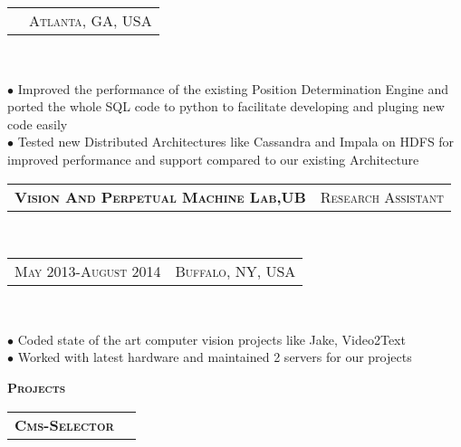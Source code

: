 \documentclass[10pt,a4paper,oneside]{article}
\begin{document}
\begin{minipage}[t]{0.63\textwidth}
{\begin{tabular}{c|c}
               &{\small A\textsc{tlanta}, GA, USA}
            \end{tabular}
        }\\ 
        \vspace{-4mm}
        \begin{adjustwidth}{7pt}{0pt}
            {\footnotesize $\bullet$ Improved the performance of the existing Position Determination Engine and ported the whole SQL code to python to facilitate developing and pluging new code easily\\
            $\bullet$ Tested new Distributed Architectures like Cassandra and Impala on HDFS for improved performance and support compared to our existing Architecture}\\
        \end{adjustwidth}
        \begin{tabular}{c|c}
            \textbf{\normalsize V\textsc{ision} A\textsc{nd} P\textsc{erpetual} M\textsc{achine} L\textsc{ab},UB}
            &\textmd{\normalsize R\textsc{esearch} A\textsc{ssistant}}
        \end{tabular}\\
        \textcolor{light-gray}{
            \begin{tabular}{c|c}
                {\small M\textsc{ay 2013}-A\textsc{ugust 2014}}
               &{\small B\textsc{uffalo}, NY, USA}
            \end{tabular}
        }\\ 
        \vspace{-4mm}
        \begin{adjustwidth}{7pt}{0pt}
            {\footnotesize $\bullet$ Coded state of the art computer vision projects like Jake, Video2Text\\
            $\bullet$ Worked with latest hardware and maintained 2 servers for our projects}\\
        \end{adjustwidth}
        \textcolor{light-gray}{\textbf{\large P\textsc{rojects}}}
        \vspace{10pt}\\
        \begin{tabular}{c|c}
            \textbf{\normalsize C\textsc{ms}-S\textsc{elector}}

\end{tabular}
\end{minipage}
\end{document}
